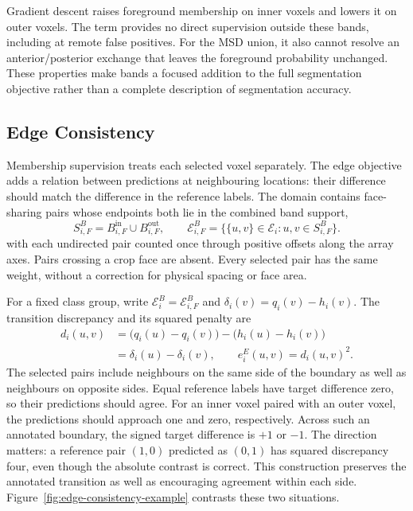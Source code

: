 \documentclass[12pt,a4paper]{article}
\begin{document}
Gradient descent raises foreground membership on inner voxels and lowers
it on outer voxels. The term provides no direct supervision outside
these bands, including at remote false positives. For the MSD union,
it also cannot resolve an anterior/posterior exchange that leaves the
foreground probability unchanged. These properties make bands a focused
addition to the full segmentation objective rather than a complete
description of segmentation accuracy.

\subsection{Edge Consistency}\label{sec:edge-constraints}

Membership supervision treats each selected voxel separately. The edge
objective adds a relation between predictions at neighbouring locations:
their difference should match the difference in the reference labels.
The domain contains face-sharing pairs whose endpoints both lie in the
combined band support,
\begin{equation}
S_{i,F}^{B}=B_{i,F}^{\mathrm{in}}\cup B_{i,F}^{\mathrm{out}},
\qquad
\mathcal{E}_{i,F}^{B}
=\bigl\{\{u,v\}\in\mathcal{E}_i:
          u,v\in S_{i,F}^{B}\bigr\}.
\label{eq:edge-supported-pairs}
\end{equation}
with each undirected pair counted once through positive offsets along
the array axes. Pairs crossing a crop face are absent. Every selected
pair has the same weight, without a correction for physical spacing or
face area.

For a fixed class group, write $\mathcal E_i^B=\mathcal E_{i,F}^B$
and $\delta_i(v)=q_i(v)-h_i(v)$. The transition discrepancy and its
squared penalty are
\begin{equation}
\begin{aligned}
d_i(u,v)
 &=\bigl(q_i(u)-q_i(v)\bigr)
   -\bigl(h_i(u)-h_i(v)\bigr)\\
 &=\delta_i(u)-\delta_i(v),
\qquad e_i^{E}(u,v)=d_i(u,v)^2.
\end{aligned}
\label{eq:edge-transition-discrepancy}
\end{equation}
The selected pairs include neighbours on the same side of the boundary
as well as neighbours on opposite sides. Equal reference labels have
target difference zero, so their predictions should agree. For an inner
voxel paired with an outer voxel, the predictions should approach one
and zero, respectively. Across such an annotated boundary, the signed
target difference is $+1$ or $-1$. The direction matters: a
reference pair $(1,0)$ predicted as $(0,1)$ has squared discrepancy four,
even though the absolute contrast is correct. This construction preserves
the annotated transition as well as encouraging agreement within each
side.
Figure~\ref{fig:edge-consistency-example} contrasts these two situations.
\end{document}
